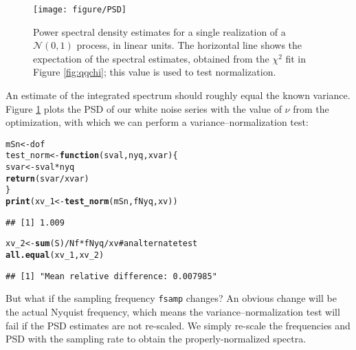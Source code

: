 \documentclass[11pt]{article}\usepackage{graphicx, color}
\makeatletter
\def\maxwidth{ %
  \ifdim\Gin@nat@width>\linewidth
    \linewidth
  \else
    \Gin@nat@width
  \fi
}
\newcommand{\hlfunctioncall}[1]{\textcolor[rgb]{0.501960784313725,0,0.329411764705882}{\textbf{#1}}}%
\newcommand{\hlcomment}[1]{\textcolor[rgb]{0.180392156862745,0.6,0.341176470588235}{#1}}%
\newenvironment{kframe}{%
 \def\at@end@of@kframe{}%
 \ifinner\ifhmode%
  \def\at@end@of@kframe{\end{minipage}}%
  \begin{minipage}{\columnwidth}%
 \fi\fi%
 \def\FrameCommand##1{\hskip\@totalleftmargin \hskip-\fboxsep
 \colorbox{shadecolor}{##1}\hskip-\fboxsep
     \hskip-\linewidth \hskip-\@totalleftmargin \hskip\columnwidth}%
 \MakeFramed {\advance\hsize-\width
   \@totalleftmargin\z@ \linewidth\hsize
   \@setminipage}}%
 {\par\unskip\endMakeFramed%
 \at@end@of@kframe}
\newenvironment{knitrout}{}{} %
\makeatother
\begin{document}
\begin{figure}[htb!]
\begin{center}
\begin{knitrout}
\color{fgcolor}
\texttt{[image: figure/PSD]} 

\end{knitrout}

\caption{Power spectral density estimates for a single realization of a 
$\mathcal{N}(0,1)$ process, in linear units.  
The horizontal line shows the expectation of the spectral estimates, obtained
from the $\chi^2$ fit in Figure \ref{fig:qqchi}; this value is
used to test normalization.}
\label{fig:psdN}
\end{center}
\end{figure}

An estimate of the integrated spectrum
should roughly equal the known variance.
Figure \ref{fig:psdN} plots the PSD of our white noise series with
the value of $\nu$ from the optimization, 
with which we can perform a variance--normalization
test:
\begin{knitrout}
\color{fgcolor}\begin{kframe}
\begin{alltt}
mSn <- dof
test_norm <- \hlfunctioncall{function}(sval, nyq, xvar) \{
    svar <- sval * nyq
    \hlfunctioncall{return}(svar/xvar)
\}
\hlfunctioncall{print}(xv_1 <- \hlfunctioncall{test_norm}(mSn, fNyq, xv))
\end{alltt}
\begin{verbatim}
## [1] 1.009
\end{verbatim}
\begin{alltt}
xv_2 <- \hlfunctioncall{sum}(S)/Nf * fNyq/xv  \hlcomment{# an alternate test}
\hlfunctioncall{all.equal}(xv_1, xv_2)
\end{alltt}
\begin{verbatim}
## [1] "Mean relative difference: 0.007985"
\end{verbatim}
\end{kframe}
\end{knitrout}


But what if the sampling frequency \texttt{fsamp} changes? An obvious change will be
the actual Nyquist frequency, which means the variance--normalization test will
fail if the PSD estimates are not re-scaled.  We simply re-scale the frequencies
and PSD
with the sampling rate
to obtain the properly-normalized spectra.
\end{document}

